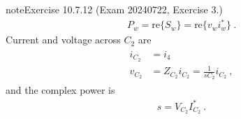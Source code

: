 \documentclass[letterpaper,10pt,italian]{jupyterBook}
\begin{document}
\begin{sphinxadmonition}{note}{Exercise 10.7.12 (Exam 2024\sphinxhyphen{}07\sphinxhyphen{}22, Exercise 3.)}
\begin{equation*}
\begin{split}P_w = \text{re} \{ S_w \} = \text{re} \{ v_w i_w^* \} \ .\end{split}
\end{equation*}
\sphinxAtStartPar
{} Current and voltage across \(C_2\) are
\begin{equation*}
\begin{split}\begin{aligned}
  i_{C_2} & = i_4 \\
  v_{C_2} & = Z_{C_2} i_{C_2} = \frac{1}{s C_2} i_{C_2} \ ,
\end{aligned}\end{split}
\end{equation*}
\sphinxAtStartPar
and the complex power is
\begin{equation*}
\begin{split}s = V_{C_2} I_{C_2}^* \ .\end{split}
\end{equation*}\end{sphinxadmonition}
 \label{exercise:exam-24-06-19-exe-01}
\end{document}
